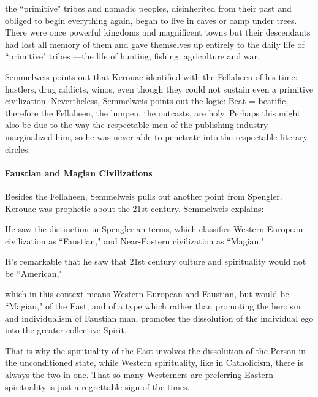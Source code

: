 \begin{quotex}
the ``primitive" tribes and nomadic peoples, disinherited from their past and obliged to begin everything again, began to live in caves or camp under trees. There were once powerful kingdoms and magnificent towns but their descendants had lost all memory of them and gave themselves up entirely to the daily life of ``primitive" tribes —the life of hunting, fishing, agriculture and war. 

\end{quotex}
Semmelweis points out that Kerouac identified with the Fellaheen of his time: hustlers, drug addicts, winos, even though they could not sustain even a primitive civilization. Nevertheless, Semmelweis points out the logic: Beat = beatific, therefore the Fellaheen, the lumpen, the outcasts, are holy. Perhaps this might also be due to the way the respectable men of the publishing industry marginalized him, so he was never able to penetrate into the respectable literary circles.

\paragraph{Faustian and Magian Civilizations}
Besides the Fellaheen, Semmelweis pulls out another point from Spengler. Kerouac was prophetic about the 21st century. Semmelweis explains:

\begin{quotex}
He saw the distinction in Spenglerian terms, which classifies Western European civilization as ``Faustian," and Near-Eastern civilization as ``Magian." 

\end{quotex}
It's remarkable that he saw that 21st century culture and spirituality would not be ``American,"

\begin{quotex}
which in this context means Western European and Faustian, but would be ``Magian," of the East, and of a type which rather than promoting the heroism and individualism of Faustian man, promotes the dissolution of the individual ego into the greater collective Spirit. 

\end{quotex}
That is why the spirituality of the East involves the dissolution of the Person in the unconditioned state, while Western spirituality, like in Catholicism, there is always the two in one. That so many Westerners are preferring Eastern spirituality is just a regrettable sign of the times.

